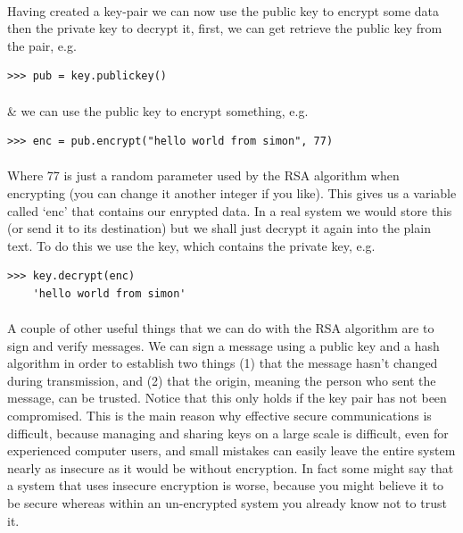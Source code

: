 \documentclass[12pt, a4paper, oneside]{book}
\begin{document}
\paragraph{} Having created a key-pair we can now use the public key to encrypt some data then the private key to decrypt it, first, we can get retrieve the public key from the pair, e.g.

\begin{lstlisting}[style=DOS]
    >>> pub = key.publickey()
\end{lstlisting}

\paragraph{} \& we can use the public key to encrypt something, e.g.

\begin{lstlisting}[style=DOS]
    >>> enc = pub.encrypt("hello world from simon", 77)
\end{lstlisting}

\paragraph{} Where 77 is just a random parameter used by the RSA algorithm when encrypting (you can change it another integer if you like). This gives us a variable called `enc' that contains our enrypted data. In a real system we would store this (or send it to its destination) but we shall just decrypt it again into the plain text. To do this we use the key, which contains the private key, e.g.

\begin{lstlisting}[style=DOS]
    >>> key.decrypt(enc)
    'hello world from simon'
\end{lstlisting}

\paragraph{} A couple of other useful things that we can do with the RSA algorithm are to sign and verify messages. We can sign a message using a public key and a hash algorithm in order to establish two things (1) that the message hasn't changed during transmission, and (2) that the origin, meaning the person who sent the message, can be trusted. Notice that this only holds if the key pair has not been compromised. This is the main reason why effective secure communications is difficult, because managing and sharing keys on a large scale is difficult, even for experienced computer users, and small mistakes can easily leave the entire system nearly as insecure as it would be without encryption. In fact some might say that a system that uses insecure encryption is worse, because you might believe it to be secure whereas within an un-encrypted system you already know not to trust it.
\end{document}
